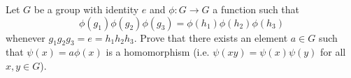 Let $G$ be a group with identity $e$ and $\phi:G\rightarrow G$
a function such that
\[\phi(g_1)\phi(g_2)\phi(g_3)=\phi(h_1)\phi(h_2)\phi(h_3)\]
whenever $g_1g_2g_3=e=h_1h_2h_3$.  Prove that there exists an element
$a\in G$ such that $\psi(x)=a\phi(x)$ is a homomorphism (i.e.
$\psi(xy)=\psi(x)\psi(y)$ for all $x,y\in G$).
